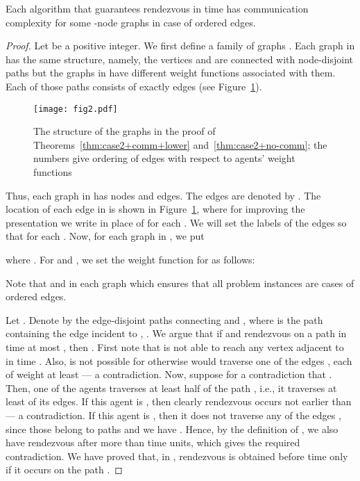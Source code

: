 \documentclass{llncs}
\begin{document}
\begin{theorem} \label{thm:case2+comm+lower}
Each algorithm that guarantees rendezvous in time  has communication complexity  for some -node graphs in case of ordered edges.
\end{theorem}

\begin{proof}
Let  be a positive integer.
We first define a family of graphs .
Each graph in  has the same structure, namely, the vertices  and  are connected with  node-disjoint paths but the graphs in  have different weight functions associated with them.
Each of those paths consists of exactly  edges (see Figure~\ref{fig:fig_case2}).
\begin{figure}[htb]
\begin{center}
\texttt{[image: fig2.pdf]}
\caption{The structure of the graphs in the proof of Theorems~\ref{thm:case2+comm+lower} and~\ref{thm:case2+no-comm}; the numbers give ordering of edges with respect to agents' weight functions}
\label{fig:fig_case2}
\end{center}
\end{figure}

Thus, each graph in  has  nodes and  edges.
The edges are denoted by .
The location of each edge in  is shown in Figure~\ref{fig:fig_case2}, where for improving the presentation we write  in place of  for each .
We will set the labels of the edges so that  for each .
Now, for each graph in , we put 
 
where .
For  and , we set the weight function  for  as follows:

Note that  and  in each graph  which ensures that all problem instances are cases of ordered edges.

Let .
Denote by  the  edge-disjoint paths connecting  and , where  is the path containing the edge  incident to , .
We argue that if  and  rendezvous on a path  in time at most , then .
First note that  is not able to reach any vertex adjacent to  in time .
Also,  is not possible for otherwise  would traverse one of the edges , each of weight at least  --- a contradiction.
Now, suppose for a contradiction that .
Then, one of the agents traverses at least half of the path , i.e., it traverses at least  of its edges.
If this agent is , then clearly rendezvous occurs not earlier than  --- a contradiction.
If this agent is , then it does not traverse any of the edges , since those belong to paths  and we have .
Hence, by the definition of , we also have rendezvous after more than  time units, which gives the required contradiction.
We have proved that, in , rendezvous is obtained before time  only if it occurs on the path .


\end{proof}
\end{document}

